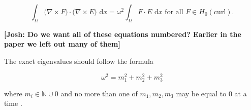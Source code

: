 \documentclass[format=acmsmall,screen,timestamp=false,a4paper]{acmart}
\newcommand{\R}{\mathbb{R}}
\newcommand\akg[1]{\textbf{\textcolor[rgb]{.5,0,1}{[Andrew: #1]}}}
\newcommand\josh[1]{\textbf{\textcolor[rgb]{0,.5,1}{[Josh: #1]}}}
\begin{document}
\begin{equation}
    \int_\Omega \big(\nabla \times F\big) \cdot \big(\nabla \times E \big) \text{ d}x = \omega^2 \int_\Omega F \cdot E \text{ d}x \text{ for all } F \in H_0(\text{curl}).
\end{equation}

\josh{Do we want all of these equations numbered?  Earlier in the paper we left out many of them}


\noindent The exact eigenvalues should follow the formula

\[ \omega^2 = m_1^2 + m_2^2 + m_3^2 \]

\noindent where $m_i \in \mathbb{N} \cup {0}$ and no more than one of $m_1, m_2, m_3$ may be equal to $0$ at a time \cite{rognes2010efficient}.

\end{document}
